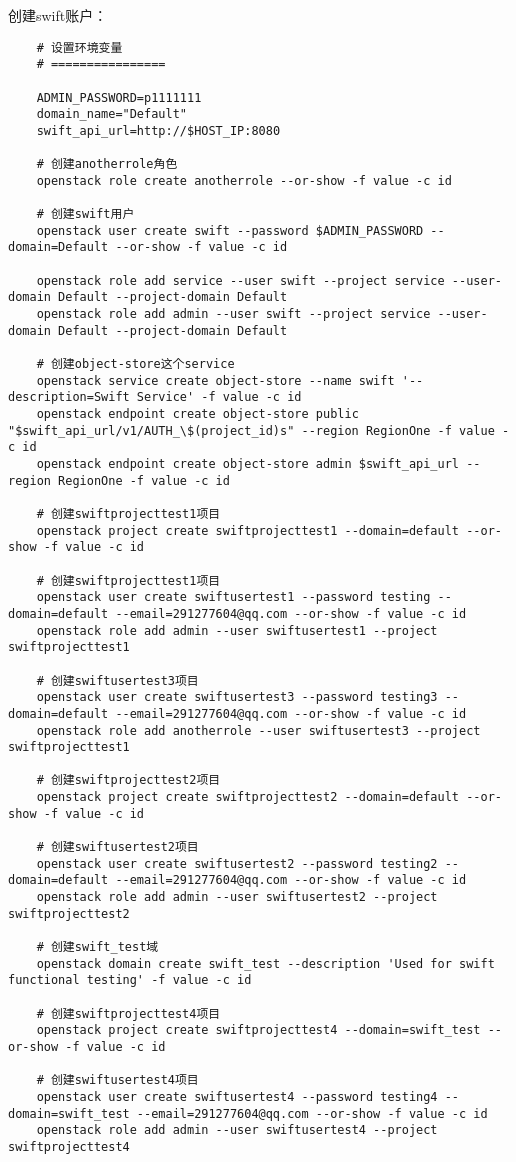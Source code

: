 \documentclass[a4paper,left=1.5cm,right=1.5cm,11pt]{article}
\begin{document}
	创建swift账户：
	\begin{lstlisting}
	# 设置环境变量
	# ================

	ADMIN_PASSWORD=p1111111
	domain_name="Default"
	swift_api_url=http://$HOST_IP:8080

	# 创建anotherrole角色
	openstack role create anotherrole --or-show -f value -c id
	
	# 创建swift用户
	openstack user create swift --password $ADMIN_PASSWORD --domain=Default --or-show -f value -c id
	
	openstack role add service --user swift --project service --user-domain Default --project-domain Default
	openstack role add admin --user swift --project service --user-domain Default --project-domain Default

	# 创建object-store这个service
	openstack service create object-store --name swift '--description=Swift Service' -f value -c id
	openstack endpoint create object-store public "$swift_api_url/v1/AUTH_\$(project_id)s" --region RegionOne -f value -c id
	openstack endpoint create object-store admin $swift_api_url --region RegionOne -f value -c id

	# 创建swiftprojecttest1项目
	openstack project create swiftprojecttest1 --domain=default --or-show -f value -c id

	# 创建swiftprojecttest1项目	
	openstack user create swiftusertest1 --password testing --domain=default --email=291277604@qq.com --or-show -f value -c id
	openstack role add admin --user swiftusertest1 --project swiftprojecttest1

	# 创建swiftusertest3项目
	openstack user create swiftusertest3 --password testing3 --domain=default --email=291277604@qq.com --or-show -f value -c id
	openstack role add anotherrole --user swiftusertest3 --project swiftprojecttest1

	# 创建swiftprojecttest2项目
	openstack project create swiftprojecttest2 --domain=default --or-show -f value -c id

	# 创建swiftusertest2项目
	openstack user create swiftusertest2 --password testing2 --domain=default --email=291277604@qq.com --or-show -f value -c id
	openstack role add admin --user swiftusertest2 --project swiftprojecttest2

	# 创建swift_test域	
	openstack domain create swift_test --description 'Used for swift functional testing' -f value -c id

	# 创建swiftprojecttest4项目
	openstack project create swiftprojecttest4 --domain=swift_test --or-show -f value -c id

	# 创建swiftusertest4项目	
	openstack user create swiftusertest4 --password testing4 --domain=swift_test --email=291277604@qq.com --or-show -f value -c id
	openstack role add admin --user swiftusertest4 --project swiftprojecttest4
	\end{lstlisting}
\end{document}
